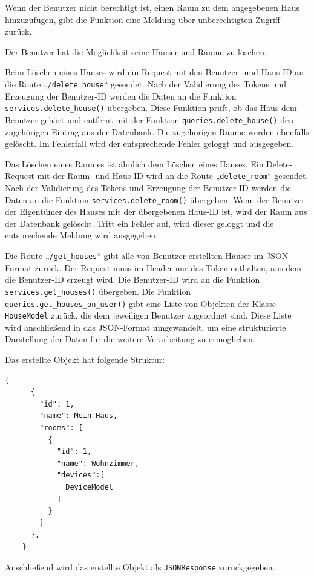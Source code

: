 \documentclass[12pt, letterpaper]{article}
\begin{document}
  \par Wenn der Benutzer nicht berechtigt ist, einen Raum zu dem angegebenen Haus hinzuzufügen, gibt die Funktion eine Meldung über unberechtigten Zugriff zurück.
  \par Der Benutzer hat die Möglichkeit seine Häuser und Räume zu löschen.
  \par Beim Löschen eines Hauses wird ein Request mit den Benutzer- und Haus-ID an die Route „\texttt{/delete\_house}“ gesendet. Nach der Validierung des Tokens und Erzeugung der Benutzer-ID werden die Daten an die Funktion \texttt{services.delete\_house()} übergeben. Diese Funktion prüft, ob das Haus dem Benutzer gehört und entfernt mit der Funktion \texttt{queries.delete\_house()} den zugehörigen Eintrag aus der Datenbank. Die zugehörigen Räume werden ebenfalls gelöscht. Im Fehlerfall wird der entsprechende Fehler geloggt und ausgegeben. 
  \par Das Löschen eines Raumes ist ähnlich dem Löschen eines Hauses. Ein Delete-Request mit der Raum- und Haus-ID wird an die Route „\texttt{delete\_room}“ gesendet. Nach der Validierung des Tokens und Erzeugung der Benutzer-ID werden die Daten an die Funktion \texttt{services.delete\_room()} übergeben. Wenn der Benutzer der Eigentümer des Hauses mit der übergebenen Haus-ID ist, wird der Raum aus der Datenbank gelöscht. Tritt ein Fehler auf, wird dieser geloggt und die entsprechende Meldung wird ausgegeben.
  \par Die Route „\texttt{/get\_houses}“ gibt alle von Benutzer erstellten Häuser im JSON-Format zurück. Der Request muss im Header nur das Token enthalten, aus dem die Benutzer-ID erzeugt wird. Die Benutzer-ID wird an die Funktion \texttt{services.get\_houses()} übergeben. Die Funktion \texttt{queries.get\_houses\_on\_user()} gibt eine Liste von Objekten der Klasse \texttt{HouseModel} zurück, die dem jeweiligen Benutzer zugeordnet sind. Diese Liste wird anschließend in das JSON-Format umgewandelt, um eine strukturierte Darstellung der Daten für die weitere Verarbeitung zu ermöglichen.
  \par Das erstellte Objekt hat folgende Struktur:
  \begin{Verbatim}[frame=single]
    {
      {
        "id": 1,
        "name": Mein Haus,
        "rooms": [
          {
            "id": 1,
            "name": Wohnzimmer,
            "devices":[
              DeviceModel
            ]
          }
        ]
      },
    }
  \end{Verbatim}
  \par Anschließend wird das erstellte Objekt als \texttt{JSONResponse} zurückgegeben.
  \pagebreak
\end{document}
